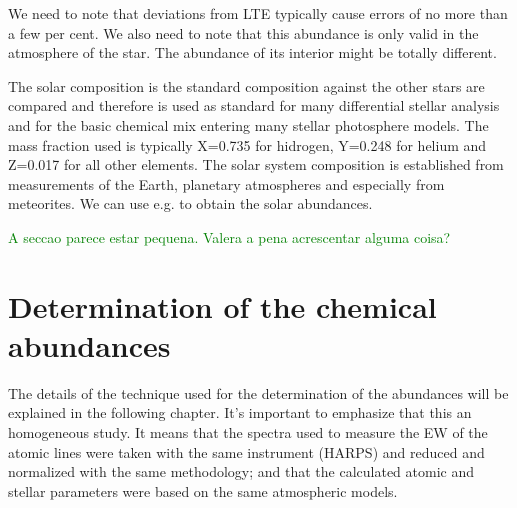 \documentclass[dvips,12pt,a4paper]{report}
\begin{document}
{We need to note that deviations from LTE typically cause errors of no more than a few per cent. We also need to note that this abundance is only valid in the atmosphere of the star. The abundance of its interior might be totally different.

The solar composition is the standard composition against the other stars are compared and therefore is used as standard for many differential stellar analysis and for the basic chemical mix entering many stellar photosphere models. The mass fraction used is typically X=0.735 for hidrogen, Y=0.248 for helium and Z=0.017 for all other elements. The solar system composition is established from measurements of the Earth, planetary atmospheres and especially from meteorites. We can use e.g. \citet{Anders-1989} to obtain the solar abundances.



\textcolor{green}{A seccao parece estar pequena. Valera a pena acrescentar alguma coisa?}


\chapter {Determination of the chemical abundances}
\label{chap_3}
The details of the technique used for the determination of the abundances will be explained in the following chapter.  It's important to emphasize that this an homogeneous study. It means that the spectra used to measure the EW of the atomic lines were taken with the same instrument (HARPS) and reduced and normalized with the same methodology; and that the calculated atomic and stellar parameters were based on the same atmospheric models.

}
\end{document}
